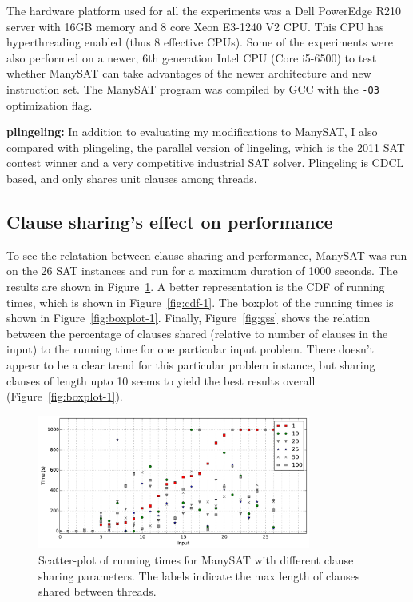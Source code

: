 \documentclass{article}
\begin{document}
The hardware platform used for all the experiments was a Dell
PowerEdge R210 server with 16GB memory and 8 core Xeon E3-1240 V2
CPU. This CPU has hyperthreading enabled (thus 8 effective CPUs). Some
of the experiments were also performed on a newer, 6th generation
Intel CPU (Core i5-6500) to test whether ManySAT can take advantages
of the newer architecture and new instruction set. The ManySAT program
was compiled by GCC with the \texttt{-O3} optimization flag.


\textbf{plingeling:} In addition to evaluating my modifications to
ManySAT, I also compared with plingeling, the parallel version of
lingeling, which is the 2011 SAT contest winner and a very competitive
industrial SAT solver. Plingeling is CDCL based, and only shares unit
clauses among threads.

\subsection{Clause sharing's effect on performance}

To see the relatation between clause sharing and performance, ManySAT
was run on the 26 SAT instances and run for a maximum duration of 1000
seconds. The results are shown in Figure~\ref{fig:scatter-1}. A better
representation is the CDF of running times, which is shown in
Figure~\ref{fig:cdf-1}. The boxplot of the running times is shown in
Figure~\ref{fig:boxplot-1}. Finally, Figure~\ref{fig:gss} shows the
relation between the percentage of clauses shared (relative to number
of clauses in the input) to the running time for one particular input
problem. There doesn't appear to be a clear trend for this particular
problem instance, but sharing clauses of length upto 10 seems to yield
the best results overall (Figure~\ref{fig:boxplot-1}). 


\begin{figure}[h]
  \centering
  \includegraphics[width=0.8\textwidth]{../figs/scatter_all.pdf}
  \caption{Scatter-plot of running times for ManySAT with different clause sharing parameters. The labels indicate the max length of clauses shared between threads.}
  \label{fig:scatter-1}
\end{figure}
\end{document}

